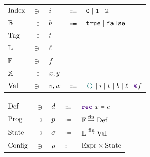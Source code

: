 \begin{figure}[tp]
    \begin{tabular}{lclcl}
            $\datalangIdx[]$
            & $\ni$ &
            $\datalangIdx$
            & $\Coloneqq$ &
            $\texttt{0} \mid \texttt{1} \mid \texttt{2}$
        \\
            $\datalangBool[]$
            & $\ni$ &
            $\datalangBool$
            & $\Coloneqq$ &
            $\texttt{true} \mid \texttt{false}$
        \\
            $\datalangTag[]$
            & $\ni$ &
            $\datalangTag$
    	\\
    		$\datalangLoc[]$
    		& $\ni$ &
    		$\datalangLoc$
        \\
            $\datalangFn[]$
            & $\ni$ &
            $\datalangFn$
        \\
            $\datalangVar[]$
            & $\ni$ &
            $\datalangVar, \datalangVarTwo$
    	\\
            $\datalangVal[]$
            & $\ni$ &
            $\datalangVal, \datalangValTwo$
            & $\Coloneqq$ &
            $\datalangUnit \mid \datalangIdx \mid \datalangTag \mid \datalangBool \mid \datalangLoc \mid \datalangFnptr{\datalangFn}$
      \\
  \end{tabular}
  \begin{tabular}{lclcl}
            $\datalangDef[]$
            & $\ni$ &
            $\datalangDef$
            & $\Coloneqq$ &
            $\datalangRec{\datalangVar}{\datalangExpr}$
        \\
            $\datalangProg[]$
            & $\ni$ &
            $\datalangProg$
            & $\coloneqq$ &
            $\datalangFn[] \finmap \datalangDef[]$
        \\
            $\datalangState[]$
            & $\ni$ &
            $\datalangState$    
            & $\coloneqq$ &
            $\datalangLoc[] \finmap \datalangVal[]$
        \\
            $\datalangConfig[]$
            & $\ni$ &
            $\datalangConfig$
            & $\coloneqq$ &
            $\datalangExpr[] \times \datalangState[]$
    \end{tabular}


\end{figure}
